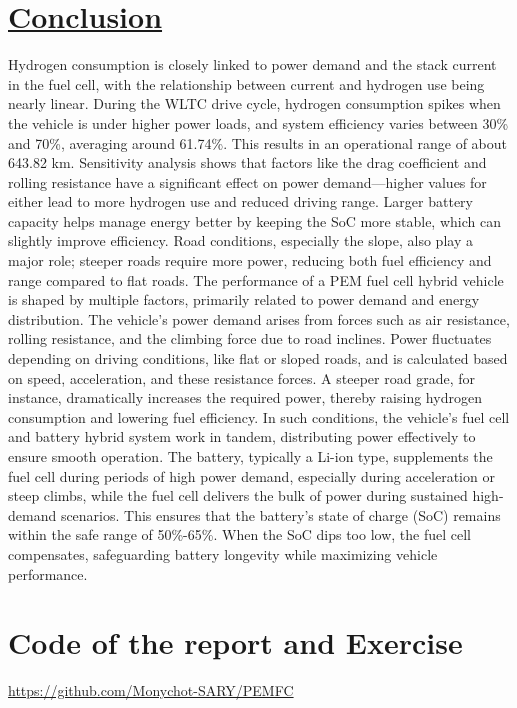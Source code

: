 \documentclass[12pt,a4paper]{article}
\numberwithin{equation}{section}
\begin{document}
\section{\underline{Conclusion}}

Hydrogen consumption is closely linked to power demand and the stack current in the fuel cell, with the relationship between current and hydrogen use being nearly linear. During the WLTC drive cycle, hydrogen consumption spikes when the vehicle is under higher power loads, and system efficiency varies between 30\% and 70\%, averaging around 61.74\%. This results in an operational range of about 643.82 km. Sensitivity analysis shows that factors like the drag coefficient and rolling resistance have a significant effect on power demand—higher values for either lead to more hydrogen use and reduced driving range. Larger battery capacity helps manage energy better by keeping the SoC more stable, which can slightly improve efficiency. Road conditions, especially the slope, also play a major role; steeper roads require more power, reducing both fuel efficiency and range compared to flat roads.
The performance of a PEM fuel cell hybrid vehicle is shaped by multiple factors, primarily related to power demand and energy distribution. The vehicle’s power demand arises from forces such as air resistance, rolling resistance, and the climbing force due to road inclines. Power fluctuates depending on driving conditions, like flat or sloped roads, and is calculated based on speed, acceleration, and these resistance forces. A steeper road grade, for instance, dramatically increases the required power, thereby raising hydrogen consumption and lowering fuel efficiency. In such conditions, the vehicle’s fuel cell and battery hybrid system work in tandem, distributing power effectively to ensure smooth operation. The battery, typically a Li-ion type, supplements the fuel cell during periods of high power demand, especially during acceleration or steep climbs, while the fuel cell delivers the bulk of power during sustained high-demand scenarios. This ensures that the battery’s state of charge (SoC) remains within the safe range of 50\%-65\%. When the SoC dips too low, the fuel cell compensates, safeguarding battery longevity while maximizing vehicle performance.

\section*{Code of the report and Exercise}
\url{https://github.com/Monychot-SARY/PEMFC}
\end{document}
